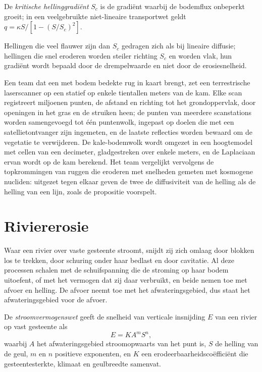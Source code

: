 \begin{definition}\label{def:b3:quantitative-geomorphology:critical}
De \emph{kritische hellinggradiënt}
$S_c$ is de gradiënt waarbij de bodemflux onbeperkt groeit; in een
veelgebruikte niet-lineaire transportwet geldt $q = \kappa S/[1 - (S/S_c)^2]$.
\end{definition}

Hellingen die veel flauwer zijn dan $S_c$ gedragen zich als bij lineaire diffusie; hellingen die
snel eroderen worden steiler richting $S_c$ en worden vlak, hun gradiënt wordt bepaald door de
drempelwaarde en niet door de erosiesnelheid.

\begin{inthefield}
Een team dat een met bodem bedekte rug in kaart brengt, zet een terrestrische laserscanner op een
statief op enkele tientallen meters van de kam. Elke scan registreert miljoenen
punten, de afstand en richting tot het grondoppervlak, door openingen in
het gras en de struiken heen; de punten van meerdere scanstations worden samengevoegd
tot één puntenwolk, ingepast op doelen die met een satellietontvanger zijn ingemeten,
en de laatste reflecties worden bewaard om de vegetatie te verwijderen. De kale-bodemwolk
wordt omgezet in een hoogtemodel met cellen van een decimeter, gladgestreken over enkele
meters, en de Laplaciaan ervan wordt op de kam berekend. Het team vergelijkt vervolgens de
topkrommingen van ruggen die eroderen met snelheden gemeten met kosmogene
nucliden: uitgezet tegen elkaar geven de twee de diffusiviteit van de
helling als de helling van een lijn, zoals de propositie voorspelt.
\end{inthefield}

\section{Riviererosie}\label{sec:b3:quantitative-geomorphology:rivers}

Waar een rivier over vaste gesteente stroomt, snijdt zij zich omlaag door blokken los te trekken,
door schuring onder haar bedlast en door cavitatie. Al deze processen schalen met de schuifspanning
die de stroming op haar bodem uitoefent, of met het vermogen dat zij daar verbruikt, en beide nemen toe
met afvoer en helling. De afvoer neemt toe met het afwateringsgebied, dus staat
het afwateringsgebied voor de afvoer.

\begin{definition}[Stroomvermogenswet]\label{def:b3:quantitative-geomorphology:stream-power}
De \emph{stroomvermogenswet} geeft de snelheid van
verticale insnijding $E$ van een rivier op vast gesteente als
\[
E = K A^m S^n ,
\]
waarbij $A$ het afwateringsgebied stroomopwaarts van het punt is, $S$ de helling van de
geul, $m$ en $n$ positieve exponenten, en $K$ een erodeerbaarheidscoëfficiënt
die gesteentesterkte, klimaat en geulbreedte samenvat.
\end{definition}

